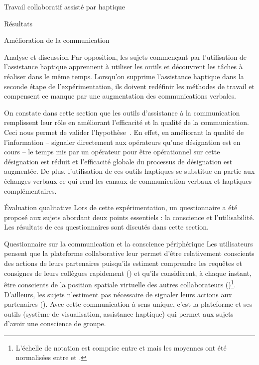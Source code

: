\documentclass[myfrancais,ngerman,english,french]{mythesis}
\begin{document}
\begin{mychapter}{Travail collaboratif assisté par haptique}
\begin{mysection}{Résultats}
\begin{mysubsection}{Amélioration de la communication}
\begin{mysubsubsection}{Analyse et discussion}
					Par opposition, les sujets commençant par l'utilisation de l'assistance haptique apprennent à utiliser les outils et découvrent les tâches à réaliser dans le même temps.
					Lorsqu'on supprime l'assistance haptique dans la seconde étape de l'expérimentation, ils doivent redéfinir les méthodes de travail et compensent ce manque par une augmentation des communications verbales.

					On constate dans cette section que les outils d'assistance à la communication remplissent leur rôle en améliorant l'efficacité et la qualité de la communication.
					Ceci nous permet de valider l'hypothèse~.
					En effet, en améliorant la qualité de l'information -- signaler directement aux opérateurs qu'une désignation est en cours -- le temps mis par un opérateur pour être opérationnel sur cette désignation est réduit et l'efficacité globale du processus de désignation est augmentée.
					De plus, l'utilisation de ces outils haptiques se substitue en partie aux échanges verbaux ce qui rend les canaux de communication verbaux et haptiques complémentaires.
				\end{mysubsubsection}
			\end{mysubsection}
			\begin{mysubsection}{Évaluation qualitative}
				Lors de cette expérimentation, un questionnaire a été proposé aux sujets abordant deux points essentiels : la conscience et l'utilisabilité.
				Les résultats de ces questionnaires sont discutés dans cette section.
				\begin{mysubsubsection}{Questionnaire sur la communication et la conscience périphérique}
					Les utilisateurs pensent que la plateforme collaborative leur permet d'être relativement conscients des actions de leurs partenaires puisqu'ils estiment comprendre les requêtes et consignes de leurs collègues rapidement () et qu'ils considèrent, à chaque instant, être conscients de la position spatiale virtuelle des autres collaborateurs ()\footnote{L'échelle de notation est comprise entre  et  mais les moyennes ont été normalisées entre  et .}.
					D'ailleurs, les sujets n'estiment pas nécessaire de signaler leurs actions aux partenaires ().
					Avec cette communication à sens unique, c'est la plateforme et ses outils (système de visualisation, assistance haptique) qui permet aux sujets d'avoir une conscience de groupe.


\end{mysubsubsection}
\end{mysubsection}
\end{mysection}
\end{mychapter}
\end{document}
